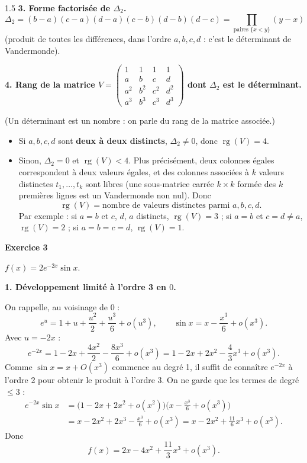 \documentclass[12pt]{article}
\begin{document}
\begin{spacing}{1.5}
\textbf{3. Forme factorisée de $\Delta_2$.}
\[
\boxed{\Delta_2=(b-a)(c-a)(d-a)(c-b)(d-b)(d-c)=\prod_{\text{paires } \{x<y\}}(y-x)}
\]
(produit de toutes les différences, dans l'ordre $a,b,c,d$ : c'est le déterminant de Vandermonde).

\textbf{4. Rang de la matrice $V=\begin{pmatrix}
1 & 1 & 1 & 1 \\
a & b & c & d \\
a^2 & b^2 & c^2 & d^2 \\
a^3 & b^3 & c^3 & d^3
\end{pmatrix}$ dont $\Delta_2$ est le déterminant.}

(Un déterminant est un nombre : on parle du rang de la matrice associée.)

\begin{itemize}
\item Si $a,b,c,d$ sont \textbf{deux à deux distincts}, $\Delta_2\neq0$, donc $\operatorname{rg}(V)=4$.
\item Sinon, $\Delta_2=0$ et $\operatorname{rg}(V)<4$. Plus précisément, deux colonnes égales correspondent à deux valeurs égales, et des colonnes associées à $k$ valeurs distinctes $t_1,\dots,t_k$ sont libres (une sous-matrice carrée $k\times k$ formée des $k$ premières lignes est un Vandermonde non nul). Donc
\[
\operatorname{rg}(V)=\text{nombre de valeurs distinctes parmi } a,b,c,d .
\]
Par exemple : si $a=b$ et $c$, $d$, $a$ distincts, $\operatorname{rg}(V)=3$ ; si $a=b$ et $c=d\neq a$, $\operatorname{rg}(V)=2$ ; si $a=b=c=d$, $\operatorname{rg}(V)=1$.
\end{itemize}

\medskip\textbf{Exercice 3}

$f(x)=2e^{-2x}\sin x$.

\textbf{1. Développement limité à l'ordre 3 en $0$.}

On rappelle, au voisinage de $0$ :
\[
e^{u}=1+u+\frac{u^2}{2}+\frac{u^3}{6}+o(u^3),\qquad \sin x=x-\frac{x^3}{6}+o(x^3).
\]
Avec $u=-2x$ :
\[
e^{-2x}=1-2x+\frac{4x^2}{2}-\frac{8x^3}{6}+o(x^3)=1-2x+2x^2-\frac43x^3+o(x^3).
\]
Comme $\sin x=x+O(x^3)$ commence au degré 1, il suffit de connaître $e^{-2x}$ à l'ordre 2 pour obtenir le produit à l'ordre 3. On ne garde que les termes de degré $\le3$ :
\begin{align*}
e^{-2x}\sin x&=\big(1-2x+2x^2+o(x^2)\big)\Big(x-\frac{x^3}{6}+o(x^3)\Big)\\
&=x-2x^2+2x^3-\frac{x^3}{6}+o(x^3)=x-2x^2+\frac{11}{6}x^3+o(x^3).
\end{align*}
Donc
\[
\boxed{f(x)=2x-4x^2+\frac{11}{3}x^3+o(x^3)}.
\]


\end{spacing}
\end{document}
